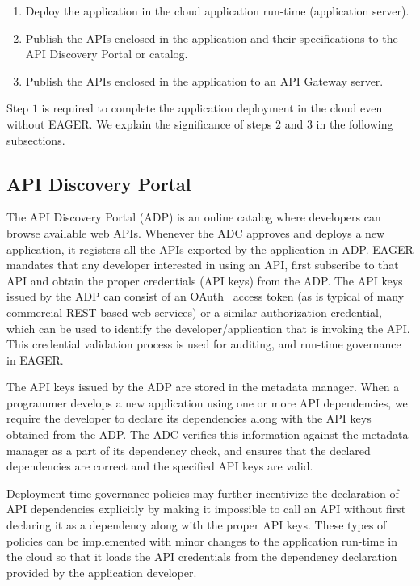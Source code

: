 \begin{enumerate}
\item Deploy the application in the cloud application run-time (application server).
\item Publish the APIs enclosed in the application and their specifications to
the API Discovery Portal or catalog.
\item Publish the APIs enclosed in the application to an API Gateway server.
\end{enumerate}

Step $1$ is required to complete the application deployment in the cloud even
without EAGER. We explain the significance of steps $2$ and $3$ in the 
following subsections.

\subsection{API Discovery Portal} 
The API Discovery Portal (ADP) is an online
catalog where developers can browse available web APIs. Whenever the ADC
approves and deploys a new application, it registers all the APIs exported by
the application in ADP.  EAGER mandates that any developer interested in using
an API, first subscribe to that API and obtain the proper credentials (API
keys) from the ADP. The API keys issued by the ADP can consist of an
OAuth~\cite{oauth2}
access
token (as is typical of many commercial REST-based web services) 
or a similar authorization credential, which can be used to identify the
developer/application that is invoking the API. This credential
validation process is used for auditing, and run-time governance in EAGER.

The API keys issued by the ADP are stored in the metadata manager. When a
programmer develops a new application using one or more API dependencies, we
require the developer to declare its dependencies along with the API
keys obtained from the ADP. The ADC verifies this information against
the metadata manager as a part of its dependency check, and ensures that the
declared dependencies are correct and the specified API keys are valid. 

Deployment-time governance policies
may further incentivize the declaration of API 
dependencies explicitly by making it 
impossible to call an API without first declaring it as a dependency along
with the proper API keys. These types of policies can be implemented
with minor changes to the
application run-time in the cloud so that it loads the API credentials from
the dependency declaration provided by the application developer.

